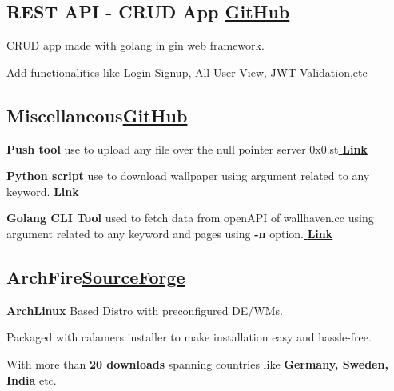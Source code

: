 \documentclass[a4paper,12pt]{article}
\begin{document}
\vspace*{4pt}
\subsection{{REST API - CRUD App }\hfill \href{https://github.com/lucifer1708/golang-REST-API-backend}{\textbf{GitHub}}} %
\begin{zitemize}
\item CRUD app made with golang in gin web framework.
\item Add functionalities like Login-Signup, All User View, JWT Validation,etc
\end{zitemize}
\vspace*{4pt}
\subsection{{Miscellaneous}\hfill \href{https://gist.github.com/lucifer1708}{\textbf{GitHub}}} 
\begin{zitemize}
  \item \textbf{Push tool} use to upload any file over the null pointer server 0x0.st\href{https://gist.github.com/lucifer1708/196a83a11efa5b1b17fd23a79dfb812e}{\textbf{ Link}}
  \item \textbf{Python script} use to download wallpaper using argument related to any keyword.\href{https://gist.github.com/lucifer1708/d46f4f91b1bff345aba25afc1e81f6d6}{\textbf{ Link}}
\item \textbf{Golang CLI Tool} used to fetch data from openAPI of wallhaven.cc using argument related to any keyword and pages using \textbf{-n} option.\href{https://github.com/lucifer1708/go-practice-apps.git}{\textbf{ Link}}
\end{zitemize}

\vspace*{4pt}
\subsection{{ArchFire}\hfill \href{https://sourceforge.net/projects/archfire/}{\textbf{SourceForge}}} 
\begin{zitemize}
  \item \textbf{ArchLinux} Based Distro with preconfigured DE/WMs.
\item Packaged with calamers installer to make installation easy and hassle-free.
\item With more than \textbf{20 downloads} spanning countries like \textbf{Germany, Sweden, India }etc.
\end{zitemize}
\end{document}
